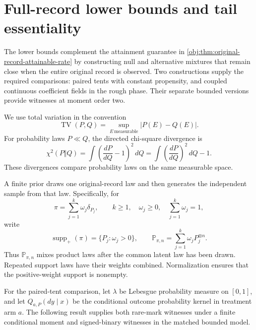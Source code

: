 \section{Full-record lower bounds and tail essentiality}

The lower bounds complement the attainment guarantee in \cref{obj:thm:original-record-attainable-rate} by constructing null and alternative mixtures that remain close when the entire original record is observed. Two constructions supply the required comparisons: paired tents with constant propensity, and coupled continuous coefficient fields in the rough phase. Their separate bounded versions provide witnesses at moment order two.

We use total variation in the convention
\[
\operatorname{TV}(P,Q)=\sup_{E\ \mathrm{measurable}}|P(E)-Q(E)|.
\]
For probability laws \(P\ll Q\), the directed chi-square divergence is
\[
\chi^2(P\Vert Q)
=\int\left(\frac{dP}{dQ}-1\right)^2\,dQ
=\int\left(\frac{dP}{dQ}\right)^2\,dQ-1.
\]
These divergences compare probability laws on the same measurable space.

A finite prior draws one original-record law and then generates the independent sample from that law. Specifically, for
\[
\pi=\sum_{j=1}^{k}\omega_j\delta_{P_j},
\qquad
k\ge1,\quad \omega_j\ge0,\quad \sum_{j=1}^{k}\omega_j=1,
\]
write
\[
\operatorname{supp}_+(\pi)=\{P_j:\omega_j>0\},
\qquad
\mathbb P_{\pi,n}=\sum_{j=1}^{k}\omega_jP_j^{\otimes n}.
\]
Thus \(\mathbb P_{\pi,n}\) mixes product laws after the common latent law has been drawn. Repeated support laws have their weights combined. Normalization ensures that the positive-weight support is nonempty.

For the paired-tent comparison, let \(\lambda\) be Lebesgue probability measure on \([0,1]\), and let \(Q_{a,P}(dy\mid x)\) be the conditional outcome probability kernel in treatment arm \(a\). The following result supplies both rare-mark witnesses under a finite conditional moment and signed-binary witnesses in the matched bounded model.

